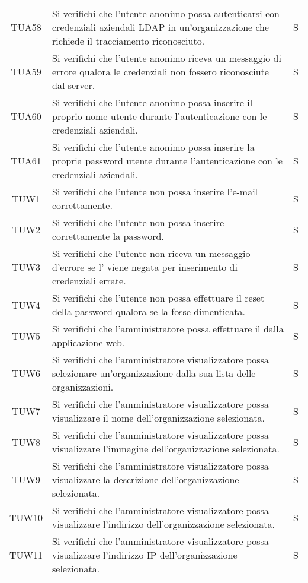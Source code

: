 {\begin{longtable}{ c C{13cm} C{1cm}}
TUA58 & Si verifichi che l’utente anonimo possa autenticarsi con credenziali aziendali LDAP in un'organizzazione che richiede il tracciamento riconosciuto. & S \\
TUA59 & Si verifichi che l’utente anonimo riceva un messaggio di errore qualora le credenziali  non fossero riconosciute dal server. & S \\
TUA60 & Si verifichi che l’utente anonimo possa inserire il proprio nome utente durante l'autenticazione con le credenziali  aziendali. & S \\
TUA61 & Si verifichi che l’utente anonimo possa inserire la propria password utente durante l'autenticazione con le credenziali  aziendali. & S \\
TUW1 & Si verifichi che l’utente non  possa inserire l'e-mail correttamente. & S \\
TUW2 & Si verifichi che l’utente non  possa inserire correttamente la password. & S \\
TUW3 & Si verifichi che l’utente non  riceva un messaggio d'errore se l' viene negata per inserimento di credenziali errate. & S \\
TUW4 & Si verifichi che l’utente non  possa effettuare il reset della password qualora se la fosse dimenticata. & S \\
TUW5 & Si verifichi che l'amministratore  possa effettuare il  dalla applicazione web. & S \\
TUW6 & Si verifichi che l’amministratore visualizzatore possa selezionare un’organizzazione dalla sua lista delle organizzazioni. & S \\
TUW7 & Si verifichi che l'amministratore visualizzatore possa visualizzare il nome dell'organizzazione selezionata. & S \\
TUW8 & Si verifichi che l'amministratore visualizzatore possa visualizzare l’immagine dell'organizzazione selezionata. & S \\
TUW9 & Si verifichi che l'amministratore visualizzatore possa visualizzare la descrizione dell'organizzazione selezionata. & S \\
TUW10 & Si verifichi che l'amministratore visualizzatore possa visualizzare l’indirizzo dell'organizzazione selezionata. & S \\
TUW11 & Si verifichi che l'amministratore visualizzatore possa visualizzare l’indirizzo IP dell'organizzazione selezionata. & S \\

\end{longtable}}

